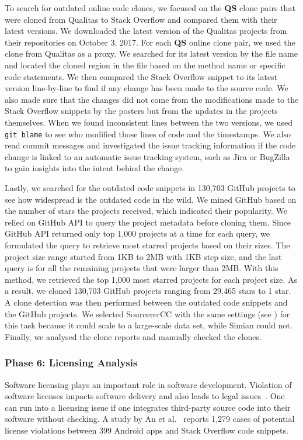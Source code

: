\documentclass[10pt,journal,compsoc]{IEEEtran}
\begin{document}
To search for outdated online code clones, we focused on the \textbf{QS} clone
pairs that were cloned from Qualitas to Stack Overflow and compared them with
their latest versions. We downloaded the latest version of the Qualitas projects
from their repositories on October 3, 2017. For each \textbf{QS} online clone
pair, we used the clone from Qualitas as a proxy. We searched for its latest
version by the file name and located the cloned region in the file based on the
method name or specific code statements. We then compared the Stack Overflow
snippet to its latest version line-by-line to find if any change has been made
to the source code. We also made sure that the changes did not come from the
modifications made to the Stack Overflow snippets by the posters but from the
updates in the projects themselves. When we found inconsistent lines between the
two versions, we used {\small\texttt{git blame}} to see who modified those lines
of code and the timestamps. We also read commit messages and investigated the issue tracking information
if the code change is linked to an automatic issue tracking system, such as Jira
or BugZilla to gain insights into the intent behind the change.

Lastly, we searched for the outdated code snippets in 130,703 GitHub projects to
see how widespread is the outdated code in the wild. We mined GitHub
based on the number of stars the projects received, which indicated their popularity. We relied on
GitHub API to query the project metadata before cloning them.
Since GitHub API returned only top 1,000 projects at a time for each query, we formulated the
query to retrieve most starred projects based on their sizes.
The project size range started from 1KB to 2MB with 1KB step size, and the last query is
for all the remaining projects that were larger than 2MB.
With this method, we retrieved the top 1,000 most starred projects for each project size. 
As a result, we cloned 130,703 GitHub projects ranging from 29,465 stars to 1 star.
A clone detection was then performed between the outdated code snippets and the GitHub
projects. We selected SourcererCC with the same settings (see ) 
for this task because it could scale to a large-scale data set, while Simian could not. Finally, we analysed
the clone reports and manually checked the clones.

\subsubsection{Phase 6: Licensing Analysis} Software licensing plays an important
role in software development. Violation of software licenses impacts software
delivery and also leads to legal issues~\cite{Sprigman2015}. 
One can run into a licensing issue if one integrates third-party source code
into their software without checking. A study by An et al.~\cite{An2017} reports
1,279 cases of potential license violations between 399 Android apps and Stack
Overflow code snippets.
\end{document}
